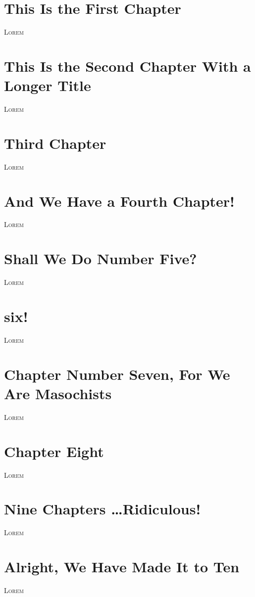 \documentclass[a4paper,oneside,11pt]{memoir}
\begin{document}
\chapter{This Is the First Chapter}
\lettrine{\textcolor[gray]{0.5}{L}}{orem} \lipsum[3-5]

\chapter{This Is the Second Chapter With a Longer Title}
\lettrine{\textcolor[gray]{0.5}{L}}{orem} \lipsum[3-5]

\chapter{Third Chapter}
\lettrine{\textcolor[gray]{0.5}{L}}{orem} \lipsum[3-5]

\chapter{And We Have a Fourth Chapter!}
\lettrine{\textcolor[gray]{0.5}{L}}{orem} \lipsum[3-5]

\chapter{Shall We Do Number Five?}
\lettrine{\textcolor[gray]{0.5}{L}}{orem} \lipsum[3-5]

\chapter{six!}
\lettrine{\textcolor[gray]{0.5}{L}}{orem} \lipsum[3-5]

\chapter{Chapter Number Seven, For We Are Masochists}
\lettrine{\textcolor[gray]{0.5}{L}}{orem} \lipsum[3-5]

\chapter{Chapter Eight}
\lettrine{\textcolor[gray]{0.5}{L}}{orem} \lipsum[3-5]

\chapter{Nine Chapters \ldots Ridiculous!}
\lettrine{\textcolor[gray]{0.5}{L}}{orem} \lipsum[3-5]

\chapter{Alright, We Have Made It to Ten}
\lettrine{\textcolor[gray]{0.5}{L}}{orem} \lipsum[3-5]
\end{document}
